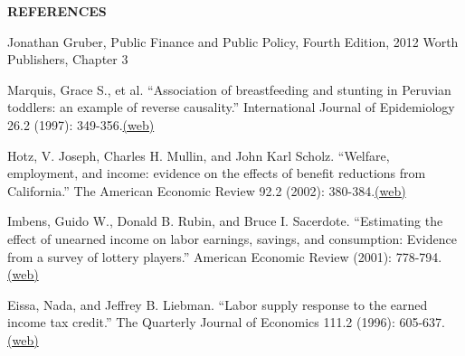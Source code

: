 \documentclass[landscape]{slides}
\begin{document}
\begin{slide}
\begin{center}
{\bf REFERENCES}
\end{center}
{\small

Jonathan Gruber, Public Finance and Public Policy, Fourth Edition, 2012 Worth Publishers, Chapter 3

Marquis, Grace S., et al. ``Association of breastfeeding and stunting in Peruvian toddlers: an example of reverse causality.'' International Journal of Epidemiology 26.2 (1997): 349-356.\href{http://elsa.berkeley.edu/~saez/course131/marquis97.pdf}{(web)}

Hotz, V. Joseph, Charles H. Mullin, and John Karl Scholz. ``Welfare, employment, and income: evidence on the effects of benefit reductions from California.'' The American Economic Review 92.2 (2002): 380-384.\href{http://www.jstor.org/stable/pdfplus/3083436.pdf?&acceptTC=true&jpdConfirm=true}{(web)}

Imbens, Guido W., Donald B. Rubin, and Bruce I. Sacerdote. ``Estimating the effect of unearned income on labor earnings, savings, and consumption: Evidence from a survey of lottery players.'' American Economic Review (2001): 778-794.\href{http://www.jstor.org/stable/pdfplus/2677812.pdf?&acceptTC=true&jpdConfirm=true}{(web)}

Eissa, Nada, and Jeffrey B. Liebman. ``Labor supply response to the earned income tax credit.'' The Quarterly Journal of Economics 111.2 (1996): 605-637.\href{http://www.jstor.org/stable/pdfplus/2946689.pdf?&acceptTC=true&jpdConfirm=true}{(web)}

}

\end{slide}
\end{document}
